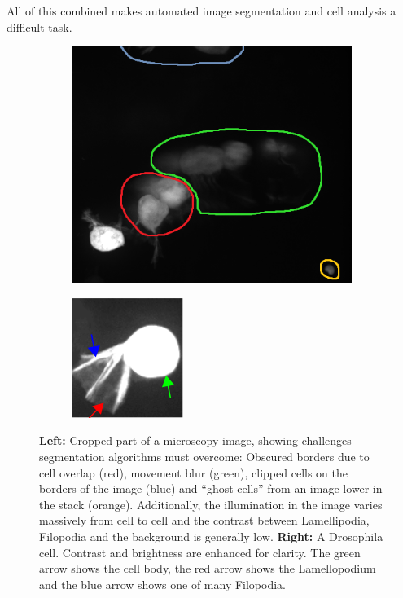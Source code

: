 All of this combined makes automated image segmentation and cell analysis a difficult task.\\

\begin {figure}[!htb]	
	\centering
	\begin {subfigure}[t]{0.50\linewidth}
		\includegraphics[scale=0.55]{img/fig_problems.png}
	\end {subfigure}
	\hspace{1cm}
	\begin {subfigure}[t]{0.40\linewidth}
		\includegraphics[scale=1.470]{img/fig_cell_example.png}
	\end {subfigure}

	\caption[Segmentation challenges and cell parts.]{\textbf{Left:} Cropped part of a microscopy image, showing challenges segmentation algorithms must overcome: Obscured borders due to cell overlap (red), movement blur (green), clipped cells on the borders of the image (blue) and ``ghost cells'' from an image lower in the stack (orange). Additionally, the illumination in the image varies massively from cell to cell and the contrast between Lamellipodia, Filopodia and the background is generally low. \textbf{Right:} A Drosophila cell. Contrast and brightness are enhanced for clarity. The green arrow shows the cell body, the red arrow shows the Lamellopodium and the blue arrow shows one of many Filopodia.}
	\label{fig:cell_example}
\end {figure}

